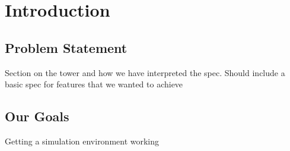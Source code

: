 \chapter{Introduction}\label{introduction}

\section{Problem Statement}
Section on the tower and how we have interpreted the spec.
Should include a basic spec for features that we wanted to achieve

\section{Our Goals}
Getting a simulation environment working